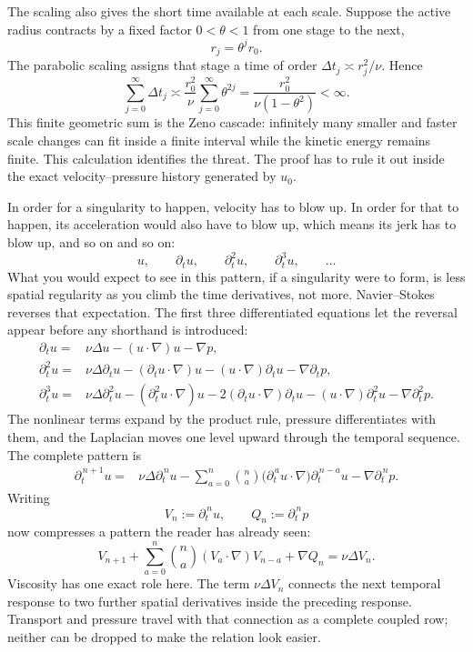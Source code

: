 \documentclass[11pt]{article}
\begin{document}
The scaling also gives the short time available at each scale. Suppose the active radius contracts by a fixed factor $0<\theta<1$ from one stage to the next,
\[
r_j=\theta^j r_0.
\]
The parabolic scaling assigns that stage a time of order $\Delta t_j\asymp r_j^2/\nu$. Hence
\[
\sum_{j=0}^{\infty}\Delta t_j
\asymp
\frac{r_0^2}{\nu}
\sum_{j=0}^{\infty}\theta^{2j}
=
\frac{r_0^2}{\nu(1-\theta^2)}
<\infty.
\]
This finite geometric sum is the Zeno cascade: infinitely many smaller and faster scale changes can fit inside a finite interval while the kinetic energy remains finite. This calculation identifies the threat. The proof has to rule it out inside the exact velocity--pressure history generated by $u_0$.

In order for a singularity to happen, velocity has to blow up. In order for that to happen, its acceleration would also have to blow up, which means its jerk has to blow up, and so on and so on:
\[
u,\qquad \partial_tu,\qquad \partial_t^2u,\qquad \partial_t^3u,\qquad\ldots
\]
What you would expect to see in this pattern, if a singularity were to form, is less spatial regularity as you climb the time derivatives, not more. Navier--Stokes reverses that expectation. The first three differentiated equations let the reversal appear before any shorthand is introduced:
\[
\begin{aligned}
\partial_tu={}&\nu\Delta u-(u\cdot\nabla)u-\nabla p,\\
\partial_t^2u={}&\nu\Delta\partial_tu
-(\partial_tu\cdot\nabla)u
-(u\cdot\nabla)\partial_tu
-\nabla\partial_tp,\\
\partial_t^3u={}&\nu\Delta\partial_t^2u
-(\partial_t^2u\cdot\nabla)u
-2(\partial_tu\cdot\nabla)\partial_tu
-(u\cdot\nabla)\partial_t^2u
-\nabla\partial_t^2p.
\end{aligned}
\]
The nonlinear terms expand by the product rule, pressure differentiates with them, and the Laplacian moves one level upward through the temporal sequence. The complete pattern is
\[
\begin{aligned}
\partial_t^{\,n+1}u={}&\nu\Delta\partial_t^{\,n}u
-\sum_{a=0}^{n}\binom{n}{a}
\bigl(\partial_t^{\,a}u\cdot\nabla\bigr)
\partial_t^{\,n-a}u
-\nabla\partial_t^{\,n}p.
\end{aligned}
\]
Writing
\[
V_n:=\partial_t^{\,n}u,
\qquad
Q_n:=\partial_t^{\,n}p
\]
now compresses a pattern the reader has already seen:
\[
V_{n+1}
+\sum_{a=0}^{n}\binom{n}{a}(V_a\cdot\nabla)V_{n-a}
+\nabla Q_n
=\nu\Delta V_n.
\]
Viscosity has one exact role here. The term $\nu\Delta V_n$ connects the next temporal response to two further spatial derivatives inside the preceding response. Transport and pressure travel with that connection as a complete coupled row; neither can be dropped to make the relation look easier.
\end{document}
